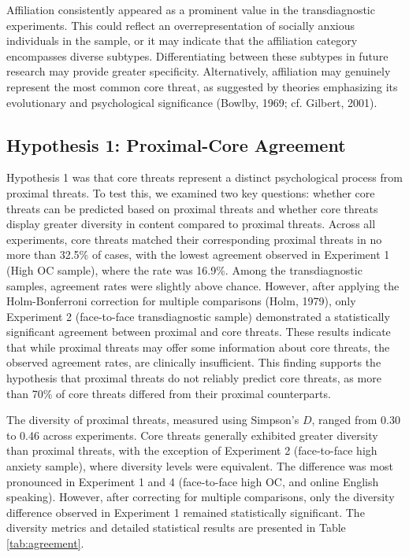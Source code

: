 \documentclass[
  man,floatsintext]{apa7}
\begin{document}
Affiliation consistently appeared as a prominent value in the transdiagnostic experiments.
This could reflect an overrepresentation of socially anxious individuals in the sample, or it may indicate that the affiliation category encompasses diverse subtypes.
Differentiating between these subtypes in future research may provide greater specificity.
Alternatively, affiliation may genuinely represent the most common core threat, as suggested by theories emphasizing its evolutionary and psychological significance (Bowlby, 1969; cf. Gilbert, 2001).

\subsection{Hypothesis 1: Proximal-Core Agreement}\label{hypothesis-1-proximal-core-agreement}

Hypothesis 1 was that core threats represent a distinct psychological process from proximal threats.
To test this, we examined two key questions: whether core threats can be predicted based on proximal threats and whether core threats display greater diversity in content compared to proximal threats.
Across all experiments, core threats matched their corresponding proximal threats in no more than 32.5\% of cases, with the lowest agreement observed in Experiment 1 (High OC sample), where the rate was 16.9\%.
Among the transdiagnostic samples, agreement rates were slightly above chance.
However, after applying the Holm-Bonferroni correction for multiple comparisons (Holm, 1979), only Experiment 2 (face-to-face transdiagnostic sample) demonstrated a statistically significant agreement between proximal and core threats.
These results indicate that while proximal threats may offer some information about core threats, the observed agreement rates, are clinically insufficient.
This finding supports the hypothesis that proximal threats do not reliably predict core threats, as more than 70\% of core threats differed from their proximal counterparts.

The diversity of proximal threats, measured using Simpson's \(D\), ranged from 0.30 to 0.46 across experiments.
Core threats generally exhibited greater diversity than proximal threats, with the exception of Experiment 2 (face-to-face high anxiety sample), where diversity levels were equivalent.
The difference was most pronounced in Experiment 1 and 4 (face-to-face high OC, and online English speaking).
However, after correcting for multiple comparisons, only the diversity difference observed in Experiment 1 remained statistically significant.
The diversity metrics and detailed statistical results are presented in Table \ref{tab:agreement}.
\end{document}
